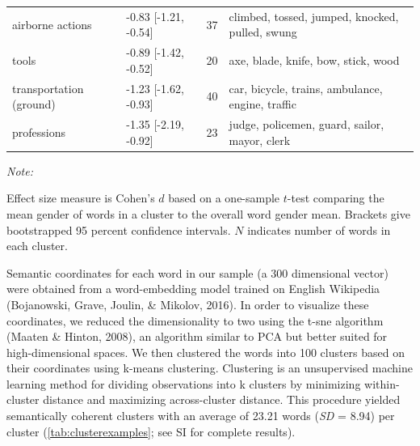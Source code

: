 \documentclass[
  english,
  ,man,floatsintext]{apa6}
\begin{document}
\begin{table}
{\begin{threeparttable}
\begin{tabular}[t]{llrl}
\hspace{1em}airborne actions & -0.83 [-1.21, -0.54] & 37 & climbed, tossed, jumped, knocked, pulled, swung\\
\hspace{1em}tools & -0.89 [-1.42, -0.52] & 20 & axe, blade, knife, bow, stick, wood\\
\hspace{1em}transportation (ground) & -1.23 [-1.62, -0.93] & 40 & car, bicycle, trains, ambulance, engine, traffic\\
\hspace{1em}professions & -1.35 [-2.19, -0.92] & 23 & judge, policemen, guard, sailor, mayor, clerk\\
\bottomrule
\end{tabular}
\begin{tablenotes}[para]
\item \textit{Note:} 
\item Effect size measure is Cohen's $d$ based on a one-sample $t$-test comparing the mean gender of words in a cluster to the overall word gender mean. Brackets give bootstrapped 95 percent confidence intervals. $N$ indicates number of words in each cluster.
\end{tablenotes}
\end{threeparttable}}
\end{table}

Semantic coordinates for each word in our sample (a 300 dimensional vector) were obtained from a word-embedding model trained on English Wikipedia (Bojanowski, Grave, Joulin, \& Mikolov, 2016). In order to visualize these coordinates, we reduced the dimensionality to two using the t-sne algorithm (Maaten \& Hinton, 2008), an algorithm similar to PCA but better suited for high-dimensional spaces. We then clustered the words into 100 clusters based on their coordinates using k-means clustering. Clustering is an unsupervised machine learning method for dividing observations into k clusters by minimizing within-cluster distance and maximizing across-cluster distance. This procedure yielded semantically coherent clusters with an average of 23.21 words (\emph{SD} = 8.94) per cluster (\autoref{tab:clusterexamples}; see SI for complete results).
\end{document}
